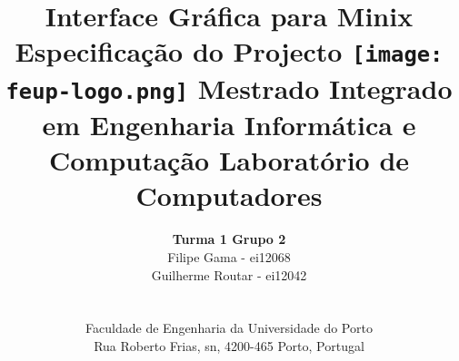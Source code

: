 \documentclass[a4paper]{article}
\begin{document}
\setlength{\textwidth}{16cm}
\setlength{\textheight}{22cm}
\lstset{language=Prolog}

\title{\Huge\textbf{Interface Gráfica para Minix }\linebreak\linebreak\linebreak
\Large\textbf{Especificação do Projecto}\linebreak\linebreak
\linebreak\linebreak
\texttt{[image: feup-logo.png]}\linebreak\linebreak
\linebreak\linebreak
\Large{Mestrado Integrado em Engenharia Informática e Computação} \linebreak\linebreak
\Large{Laboratório de Computadores}\linebreak
}

\author{\textbf{Turma 1 Grupo 2}\\
Filipe Gama - ei12068 \\
Guilherme Routar - ei12042 \\
\linebreak\linebreak \\
 \\ Faculdade de Engenharia da Universidade do Porto \\ Rua Roberto Frias, s\/n, 4200-465 Porto, Portugal \linebreak\linebreak\linebreak
\linebreak\linebreak\vspace{1cm}}

\maketitle
\thispagestyle{empty}


\newpage
\end{document}
